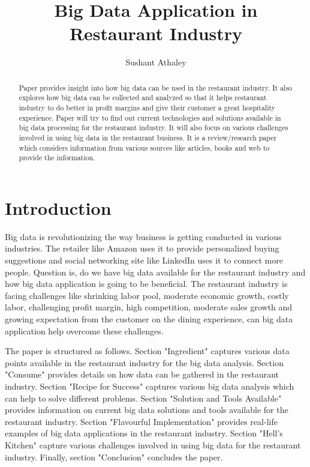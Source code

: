 \documentclass[sigconf]{acmart}
\begin{document}
\title{Big Data Application in Restaurant Industry}


\author{Sushant Athaley}



\begin{abstract}
Paper provides insight into how big data can be used in the restaurant industry. It also explores how big data can be collected and analyzed so that it helps restaurant industry to do better in profit margins and give their customer a great hospitality experience. Paper will try to find out current technologies and solutions available in big data processing for the restaurant industry. It will also focus on various challenges involved in using big data in the restaurant business. It is a review/research paper which considers information from various sources like articles, books and web to provide the information. 
\end{abstract}



\maketitle

\section{Introduction}
Big data is revolutionizing the way business is getting conducted in various industries. The retailer like Amazon uses it to provide personalized buying suggestions and social networking site like LinkedIn uses it to connect more people. Question is, do we have big data available for the restaurant industry and how big data application is going to be beneficial. The restaurant industry is facing challenges like shrinking labor pool, moderate economic growth, costly labor, challenging profit margin, high competition, moderate sales growth and growing expectation from the customer on the dining experience, can big data application help overcome these challenges.\cite{www-restaurant-challenges}

The paper is structured as follows. Section "Ingredient" captures various data points available in the restaurant industry for the big data analysis. Section "Consume" provides details on how data can be gathered in the restaurant industry. Section "Recipe for Success" captures various big data analysis which can help to solve different problems. Section "Solution and Tools Available" provides information on current big data solutions and tools available for the restaurant industry. Section "Flavourful Implementation" provides real-life examples of big data applications in the restaurant industry. Section "Hell's Kitchen" capture various challenges involved in using big data for the restaurant industry. Finally, section "Conclusion" concludes the paper.
\end{document}
